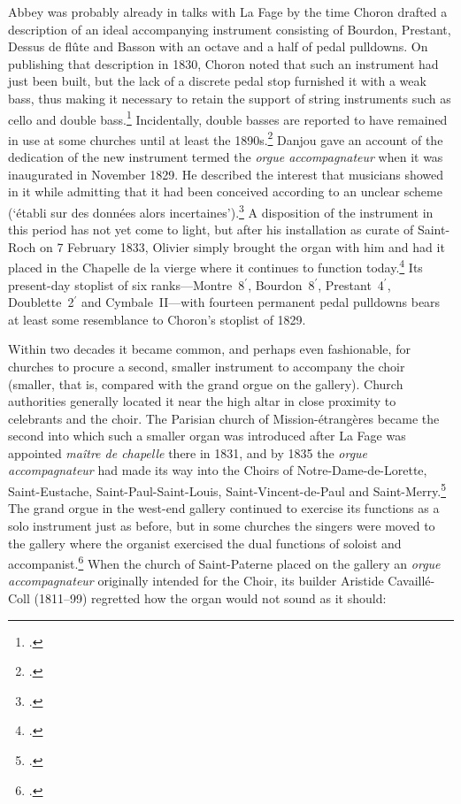 Abbey was probably already in talks with La Fage by the time Choron drafted a description of an ideal accompanying instrument consisting of Bourdon, Prestant, Dessus de flûte and Basson with an octave and a half of pedal pulldowns.
On publishing that description in 1830, Choron noted that such an instrument had just been built, but the lack of a discrete pedal stop furnished it with a weak bass, thus making it necessary to retain the support of string instruments such as cello and double bass.\footcite[260--61]{AlbrechtsbergerMethodesharmoniecomposition1830}
Incidentally, double basses are reported to have remained in use at some churches until at least the 1890s.\footcite[256 \S{}XII n.~6]{OchseOrganistsOrganPlaying2000}
Danjou gave an account of the dedication of the new instrument termed the \textit{orgue accompagnateur} when it was inaugurated in November 1829.
He described the interest that musicians showed in it while admitting that it had been conceived according to an unclear scheme (`établi sur des
données alors incertaines').\footcite[5--6]{Danjouaccompagnementplainchant1848}
A disposition of the instrument in this period has not yet come to light, but after his installation as curate of Saint-Roch on 7 February 1833, Olivier simply brought the organ with him and had it placed in the Chapelle de la vierge where it continues to function today.\footcite[202--203]{ChassantHistoireeveques1846}
Its present-day stoplist of six ranks---Montre~8$^\prime$, Bourdon~8$^\prime$, Prestant~4$^\prime$, Doublette~2$^\prime$ and Cymbale~II---with fourteen permanent pedal pulldowns bears at least some resemblance to Choron's stoplist of 1829.

Within two decades it became common, and perhaps even fashionable, for churches to procure a second, smaller instrument to accompany the choir (smaller, that is, compared with the grand orgue on the gallery).
Church authorities generally located it near the high altar in close proximity to celebrants and the choir.
The Parisian church of Mission-étrangères became the second into which such a smaller organ was introduced after La Fage was appointed \textit{maître de chapelle} there in 1831, and by 1835 the \textit{orgue accompagnateur} had made its way into the Choirs of Notre-Dame-de-Lorette, Saint-Eustache, Saint-Paul-Saint-Louis, Saint-Vincent-de-Paul and Saint-Merry.\footcite[6]{Danjouaccompagnementplainchant1848}
%
The grand orgue in the west-end gallery continued to exercise its functions as a solo instrument just as before, but in some churches the singers were moved to the gallery where the organist exercised the dual functions of soloist and accompanist.\footcite[61]{Danjouetatavenirchant1843}
When the church of Saint-Paterne placed on the gallery an \emph{orgue accompagnateur} originally intended for the Choir, its builder Aristide Cavaillé-Coll (1811--99) regretted how the organ would not sound as it should:
\pagebreak{}

